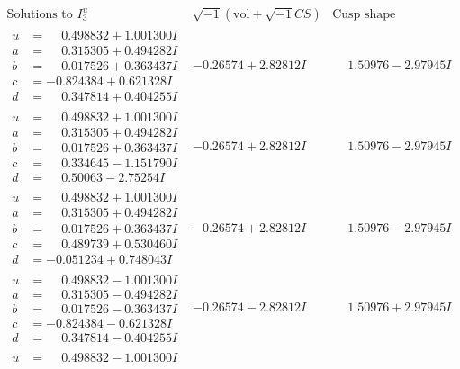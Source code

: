 \documentclass[1p]{elsarticle_modified}
\theoremstyle{definition}
\newcommand{\I}{\sqrt{-1}}
\begin{document}
$$\begin{array}{c|c|c}  
\text{Solutions to }I^u_{3}& \I (\text{vol} + \sqrt{-1}CS) & \text{Cusp shape}\\
 \hline 
\begin{aligned}
u &= \phantom{-}0.498832 + 1.001300 I \\
a &= \phantom{-}0.315305 + 0.494282 I \\
b &= \phantom{-}0.017526 + 0.363437 I \\
c &= -0.824384 + 0.621328 I \\
d &= \phantom{-}0.347814 + 0.404255 I\end{aligned}
 & -0.26574 + 2.82812 I & \phantom{-}1.50976 - 2.97945 I \\ \hline\begin{aligned}
u &= \phantom{-}0.498832 + 1.001300 I \\
a &= \phantom{-}0.315305 + 0.494282 I \\
b &= \phantom{-}0.017526 + 0.363437 I \\
c &= \phantom{-}0.334645 - 1.151790 I \\
d &= \phantom{-}0.50063 - 2.75254 I\end{aligned}
 & -0.26574 + 2.82812 I & \phantom{-}1.50976 - 2.97945 I \\ \hline\begin{aligned}
u &= \phantom{-}0.498832 + 1.001300 I \\
a &= \phantom{-}0.315305 + 0.494282 I \\
b &= \phantom{-}0.017526 + 0.363437 I \\
c &= \phantom{-}0.489739 + 0.530460 I \\
d &= -0.051234 + 0.748043 I\end{aligned}
 & -0.26574 + 2.82812 I & \phantom{-}1.50976 - 2.97945 I \\ \hline\begin{aligned}
u &= \phantom{-}0.498832 - 1.001300 I \\
a &= \phantom{-}0.315305 - 0.494282 I \\
b &= \phantom{-}0.017526 - 0.363437 I \\
c &= -0.824384 - 0.621328 I \\
d &= \phantom{-}0.347814 - 0.404255 I\end{aligned}
 & -0.26574 - 2.82812 I & \phantom{-}1.50976 + 2.97945 I \\ \hline\begin{aligned}
u &= \phantom{-}0.498832 - 1.001300 I \\

\end{aligned}
\end{array}$$
\end{document}
